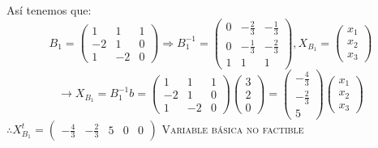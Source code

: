 \begin{itemize}
    Así tenemos que:
    $$B_1=\begin{pmatrix}1&1&1\\ -2&1&0\\ 1&-2&0\end{pmatrix}\Rightarrow B_1^{-1}=\begin{pmatrix}0&-\frac{2}{3}&-\frac{1}{3}\\ 0&-\frac{1}{3}&-\frac{2}{3}\\ 1&1&1\end{pmatrix}, X_{B_1}=\begin{pmatrix}x_1\\ x_2\\ x_3\end{pmatrix}$$
    $$\rightarrow X_{B_{1}}=B_1^{-1}b=\begin{pmatrix}1&1&1\\ -2&1&0\\ 1&-2&0\end{pmatrix}\begin{pmatrix}3\\ 2\\ 0\end{pmatrix}=\begin{pmatrix}-\frac{4}{3}\\ -\frac{2}{3}\\ 5\end{pmatrix}\begin{pmatrix}x_1\\ x_2\\ x_3\end{pmatrix}$$
    $\therefore X_{B_{1}}^{t}=\begin{pmatrix}-\frac{4}{3}&-\frac{2}{3}&5&0&0\end{pmatrix}$ \textsc{Variable básica no factible}
    

\end{itemize}
